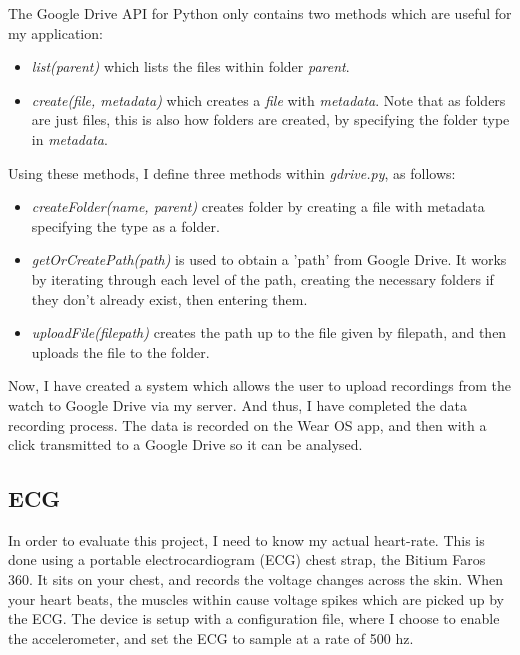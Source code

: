 \documentclass[12pt,a4paper,twoside,openany]{report}
\begin{document}
The Google Drive API for Python only contains two methods which are useful for
my application:

\begin{itemize}
	\item \emph{list(parent)} which lists the files within folder
		\emph{parent}.

	\item \emph{create(file, metadata)} which creates a \emph{file} with
		\emph{metadata}. Note that as folders
		are just files, this is also how folders are created, by
		specifying the folder type in \emph{metadata}.
\end{itemize}

Using these methods, I define three methods within \emph{gdrive.py}, as follows:

\begin{itemize}
	\item \emph{createFolder(name, parent)} creates folder by creating a
		file with metadata specifying the type as a folder.

	\item \emph{getOrCreatePath(path)} is used to obtain a 'path' from Google
		Drive. It works by iterating through each level of the path,
		creating the necessary folders if they don't already exist,
		then entering them.

	\item \emph{uploadFile(filepath)} creates the path up to the file
		given by filepath, and then uploads the file to the folder.
\end{itemize}

Now, I have created a system which allows the user to upload recordings from
the watch to Google Drive via my server. And thus, I have completed the data
recording process. The data is recorded on the Wear OS app, and then with a
click transmitted to a Google Drive so it can be analysed.


\subsection{ECG}

In order to evaluate this project, I need to know my actual heart-rate. This
is done using a portable electrocardiogram (ECG) chest strap, the Bitium Faros
360. It sits on your chest, and records the voltage changes across the skin.
When your heart beats, the muscles within cause voltage spikes which are
picked up by the ECG. The device is setup with a configuration 
file, where I choose to enable
the accelerometer, and set the ECG to sample at a rate of 500 hz.
\end{document}
